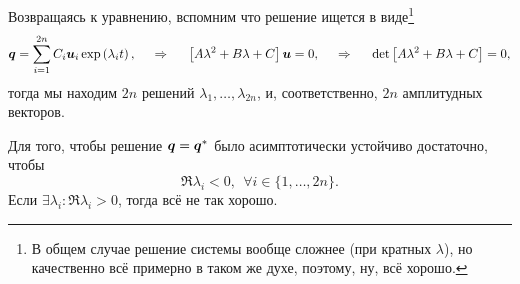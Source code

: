 Возвращаясь к уравнению, вспомним что решение ищется в виде\footnote{
    В общем случае решение системы вообще сложнее (при кратных $\lambda$), но качественно всё примерно в таком же духе, поэтому, ну, всё хорошо.
} 
\begin{equation*}
    \mbox{\boldmath $q$} = \sum_{i=1}^{2n} C_i \mbox{\boldmath $u$}_i \exp\left(
        \lambda_i t
    \right),
    \hspace{0.5cm} \Rightarrow \hspace{0.5cm}
    \left[
        A \lambda^2 + B \lambda + C
    \right] \mbox{\boldmath $u$} = 0,
    \hspace{0.5cm} \Rightarrow \hspace{0.5cm}
    \det\left[
        A \lambda^2 + B \lambda + C
    \right] = 0,
\end{equation*}
тогда мы находим $2n$ решений $\lambda_1, \ldots, \lambda_{2n}$, и, соответственно, $2n$ амплитудных векторов.


\begin{to_thr}
    Для того, чтобы решение $\mbox{\boldmath $q$} = \mbox{\boldmath $q$}^*$ было асимптотически устойчиво достаточно, чтобы
    \begin{equation*}
        \Re \lambda_i < 0, \ \ \forall i \in \{1, \ldots, 2n\}.
    \end{equation*}
    Если $\exists \lambda_i \colon \Re \lambda_i > 0$, тогда всё не так хорошо.
\end{to_thr}
